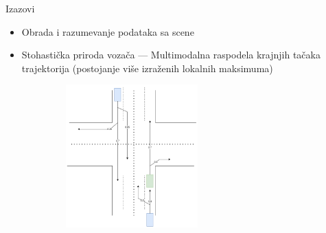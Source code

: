 \documentclass[bookmarks=true,bookmarksopen=true,pdfborder={0 0 0},pdfhighlight={/N},linkbordercolor={.5 .5 .5},implicit=false,unicode,xcolor={table}]{beamer}
\begin{document}
\begin{frame}{Izazovi}

  \begin{itemize}
    \item Obrada i razumevanje podataka sa scene
    \item Stohastička priroda vozača --- Multimodalna raspodela krajnjih tačaka trajektorija (postojanje više izraženih lokalnih maksimuma)
  \end{itemize}

  \begin{figure}
		\begin{subfigure}{5.5cm}
			\includegraphics[width=5.5cm,height=5.5cm]{multimodal.drawio.png}
		\end{subfigure}
	\end{figure}
  \hfill
  
\end{frame}
\end{document}

